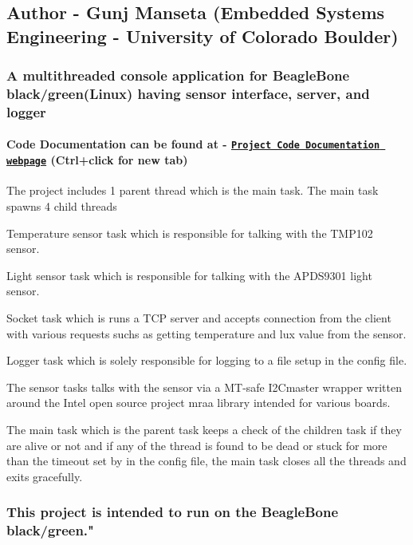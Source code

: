 \subsection*{Author -\/ Gunj Manseta (Embedded Systems Engineering -\/ University of Colorado Boulder)}

\subsubsection*{A multithreaded console application for Beagle\+Bone black/green(Linux) having sensor interface, server, and logger}

\paragraph*{Code Documentation can be found at -\/ \href{http://htmlpreview.github.io/?https://github.com/mansetagunj/ECEN-5013/blob/master/Project1/documentation/doxygenfiles.d/html/index.html}{\tt Project Code Documentation webpage} (Ctrl+click for new tab)}

The project includes 1 parent thread which is the main task. The main task spawns 4 child threads


\begin{DoxyEnumerate}
\item Temperature sensor task which is responsible for talking with the T\+M\+P102 sensor.
\item Light sensor task which is responsible for talking with the A\+P\+D\+S9301 light sensor.
\item Socket task which is runs a T\+CP server and accepts connection from the client with various requests suchs as getting temperature and lux value from the sensor.
\item Logger task which is solely responsible for logging to a file setup in the config file.
\end{DoxyEnumerate}

The sensor tasks talks with the sensor via a M\+T-\/safe I2\+Cmaster wrapper written around the Intel open source project mraa library intended for various boards.

The main task which is the parent task keeps a check of the children task if they are alive or not and if any of the thread is found to be dead or stuck for more than the timeout set by in the config file, the main task closes all the threads and exits gracefully.

\subsubsection*{This project is intended to run on the Beagle\+Bone black/green."}